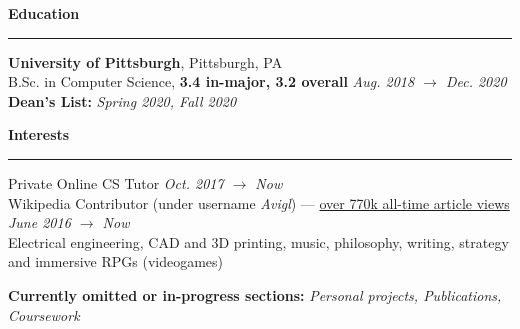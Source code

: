 \documentclass[10pt]{article}
\begin{document}
\begin{flushleft}
		\vspace{1.5mm}
		{\large \raggedright \textbf{Education}}
		\vspace{1.25mm}
	
		\hrule
		
		\vspace{2.25mm}
		\textbf{University of Pittsburgh}, Pittsburgh, PA\\
      	{\small B.Sc. in Computer Science, \textbf{3.4 in-major, 3.2 overall} \hfill \textit{Aug. 2018 $\rightarrow$ Dec. 2020}}\\
		{\small \textbf{Dean's List:} \textit{Spring 2020, Fall 2020}}\\

		\vspace{1.25mm}
		{\large \raggedright \textbf{Interests}}
		\vspace{1.25mm}
	
		\hrule
	
		\vspace{2.25mm}
		Private Online CS Tutor \hfill \textit{\small Oct. 2017 $\rightarrow$ Now}\\
		Wikipedia Contributor (under username \textit{Avigl}) --- \href{https://pageviews.toolforge.org/?project=en.wikipedia.org&platform=all-access&agent=user&redirects=0&range=all-time&pages=Timeline_of_social_media|Timeline_of_online_advertising|Timeline_of_e-commerce|Screening_Partnership_Program|Silicon_Valley_Education_Foundation|Chicago_Community_Trust}{over 770k all-time article views} \hfill \textit{\small June 2016 $\rightarrow$ Now}\\
		Electrical engineering, CAD and 3D printing, music, philosophy, writing, strategy and immersive RPGs (videogames)

		\vspace*{\fill}
		\textbf{Currently omitted or in-progress sections:} \textit{Personal projects, Publications, Coursework} 
	\end{flushleft}
\end{document}
